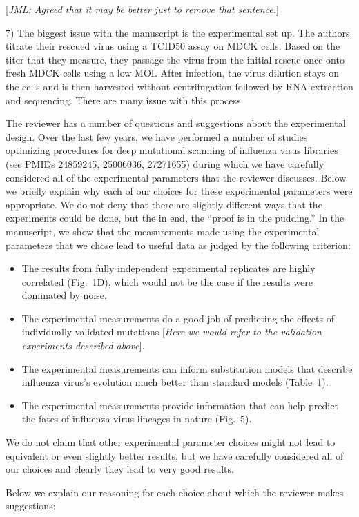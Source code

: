 \documentclass[11pt, oneside]{article}   	%
\newcommand{\comment}[1]{{\color{red}[\textsl{#1}]}}
\newcommand{\response}[1]{{\color{black}#1}}
\begin{document}
\comment{JML: Agreed that it may be better just to remove that sentence.}

7) The biggest issue with the manuscript is the experimental set up. The authors titrate their rescued virus using a TCID50 assay on MDCK cells. Based on the titer that they measure, they passage the virus from the initial rescue once onto fresh MDCK cells using a low MOI. After infection, the virus dilution stays on the cells and is then harvested without centrifugation followed by RNA extraction and sequencing. There are many issue with this process. 

\response{The reviewer has a number of questions and suggestions about the experimental design.
Over the last few years, we have performed a number of studies optimizing procedures for deep mutational scanning of influenza virus libraries (see PMIDs 24859245, 25006036, 27271655) during which we have carefully considered all of the experimental parameters that the reviewer discusses.
Below we briefly explain why each of our choices for these experimental parameters were appropriate.
We do not deny that there are slightly different ways that the experiments could be done, but the in end, the ``proof is in the pudding.'' 
In the manuscript, we show that the measurements made using the experimental parameters that we chose lead to useful data as judged by the following criterion:
\begin{itemize}
\item The results from fully independent experimental replicates are highly correlated (Fig.~1D), which would not be the case if the results were dominated by noise.
\item The experimental measurements do a good job of predicting the effects of individually validated mutations \comment{Here we would refer to the validation experiments described above}.
\item The experimental measurements can inform substitution models that describe influenza virus's evolution much better than standard models (Table~1).
\item The experimental measurements provide information that can help predict the fates of influenza virus lineages in nature (Fig.~5).
\end{itemize}
We do not claim that other experimental parameter choices might not lead to equivalent or even slightly better results, but we have carefully considered all of our choices and clearly they lead to very good results.

Below we explain our reasoning for each choice about which the reviewer makes suggestions:
}
\end{document}
